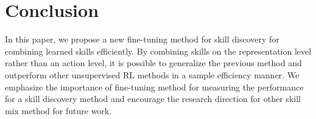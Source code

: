 
\section{Conclusion}

In this paper, we propose a new fine-tuning method for skill discovery for combining learned skills efficiently.
By combining skills on the representation level rather than an action level,
it is possible to generalize the previous method and outperform other unsupervised RL methods in a sample efficiency manner.
We emphasize the importance of fine-tuning method for measuring the performance for a skill discovery method
and encourage the research direction for other skill mix method for future work.





